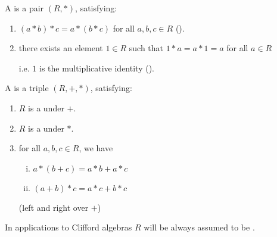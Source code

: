 \begin{definition}[Monoid]
    \label{Monoid}
    \leanok

    A  is a pair $(R, *)$, satisfying:

    \begin{enumerate}
    \item $(a * b) * c = a * (b * c)$ for all $a, b, c \in R$ ().

    \item there exists an element $1 \in R$ such that $1 * a = a * 1 = a$ for all $a \in R$
    
    i.e. $1$ is the multiplicative identity ().

    \end{enumerate}

\end{definition}

\begin{definition}[Ring]
    \label{Ring}
    \leanok

    A  is a triple $(R, +, *)$, satisfying:

    \begin{enumerate}

    \item $R$ is a  under $+$.

    \item $R$ is a  under $*$.

    \item for all $a, b, c \in R$, we have
    
    \begin{enumerate}[(i)]

    \item $a * (b + c) = a * b + a * c$
    \item $(a + b) * c = a * c + b * c$

    \end{enumerate}

    (left and right  over $+$)

    \end{enumerate}

\end{definition}

\begin{remark}
    \label{mk:CommRing}

    In applications to Clifford algebras $R$ will be always assumed to be .
    
\end{remark}

